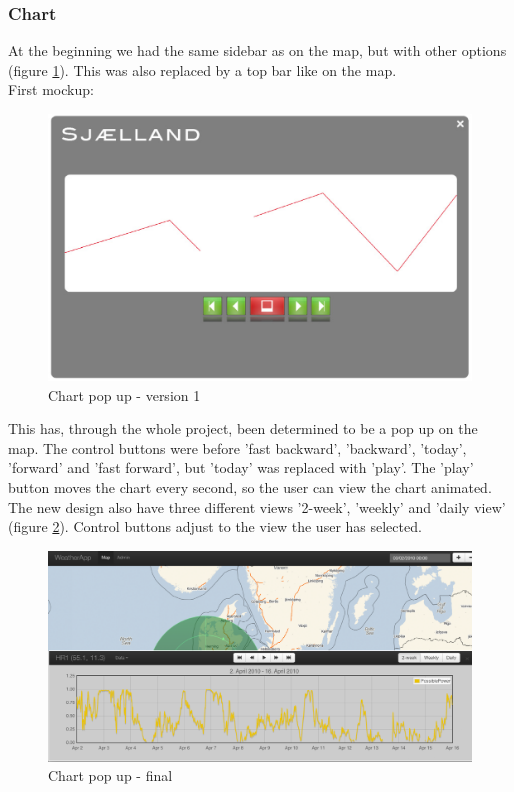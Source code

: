 \subsubsection{Chart}
At the beginning we had the same sidebar as on the map, but with other options (figure \ref{fig:chart_v1}). This was also replaced by a top bar like on the map.\\
First mockup: 
\begin{figure}[htbp]
   \centering
   \includegraphics[width=1\linewidth]{figure/design_chart_v1.eps}
   \caption{Chart pop up - version 1}
   \label{fig:chart_v1}
\end{figure}

This has, through the whole project, been determined to be a pop up on the map.
The control buttons were before 'fast backward', 'backward', 'today', 'forward' and 'fast forward', but 'today' was replaced with 'play'. The 'play' button moves the chart every second, so the user can view the chart animated.\\
The new design also have three different views '2-week', 'weekly' and 'daily view' (figure \ref{fig:chart_final}). Control buttons adjust to the view the user has selected.

\begin{figure}[htbp]
   \centering
   \includegraphics[width=1\linewidth]{figure/design_chart_final.eps}
   \caption{Chart pop up - final}
   \label{fig:chart_final}
\end{figure}



